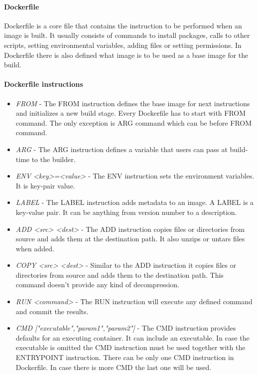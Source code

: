\documentclass[12pt,a4paper]{article}
\begin{document}
\paragraph{Dockerfile}
Dockerfile is a core file that contains the instruction to be performed when an image is built. It usually consists of commands to install packages, calls to other scripts, setting environmental variables, adding files or setting permissions. In Dockerfile there is also defined what image is to be used as a base image for the build.

\paragraph{Dockerfile instructions}
\begin{itemize}
\item \textit{FROM} - The FROM instruction defines the base image for next instructions and initializes a new build stage. Every Dockerfile
has to start with FROM command. The only exception is ARG command which can be before FROM command.
\item \textit{ARG} - The ARG instruction defines a variable that users can pass at build-time to the builder.
\item \textit{ENV <key>=<value>} - The ENV instruction sets the environment variables. It is key-pair value. 
\item \textit{LABEL} - The LABEL instruction adds metadata to an image. A LABEL is a key-value pair. It can be anything from version number to a description.
\item \textit{ADD <src> <dest>} - The ADD instruction copies files or directories from source and adds them at the destination path. It also unzips or untars files when added.
\item \textit{COPY <src> <dest>} - Similar to the ADD instruction it copies files or directories from source and adds them to the destination path. This command doesn't provide any kind of decompression.
\item \textit{RUN <command>} - The RUN instruction will execute any defined command and commit the results.
\item \textit{CMD ["executable","param1","param2"]} - The CMD instruction provides defaults for an executing container. It can include an
executable. In case the executable is omitted the CMD instruction must be used together with the ENTRYPOINT instruction. There can be only
one CMD instruction in Dockerfile. In case there is more CMD the last one will be used.

\end{itemize}
\end{document}
